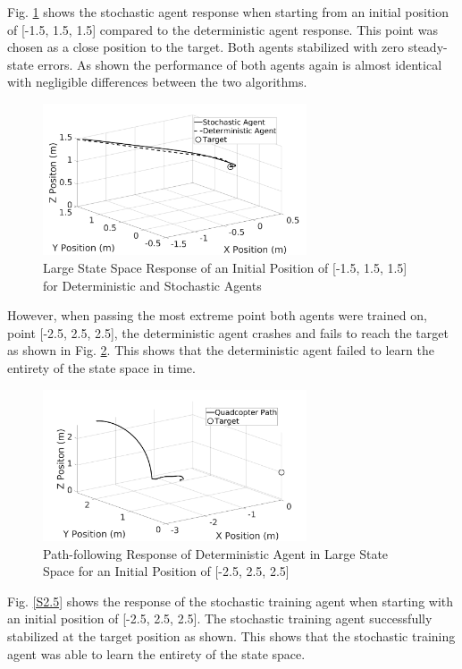 Fig. \ref{x2.5} shows the stochastic agent response when starting from an initial position of [-1.5, 1.5, 1.5] compared to the deterministic agent response. This point was chosen as a close position to the target. Both agents stabilized with zero steady-state errors. As shown the performance of both agents again is almost identical with negligible differences between the two algorithms.
\begin{figure}[H]
            \centering
            \includegraphics[width=0.695\textwidth]{plots/1_5_1.jpg}
            \caption{Large State Space Response of an Initial Position of [-1.5, 1.5, 1.5] for Deterministic and Stochastic Agents}
            \label{x2.5}
    \end{figure}
    However, when passing the most extreme point both agents were trained on, point [-2.5, 2.5, 2.5], the deterministic agent crashes and fails to reach the target as shown in Fig. \ref{T2.5}. This shows that the deterministic agent failed to learn the entirety of the state space in time. 
    \begin{figure}[H]
            \centering
            \includegraphics[width=0.695\textwidth]{plots/2_5_crash.jpg}
            \caption{Path-following Response of Deterministic Agent in Large State Space for an Initial Position of [-2.5, 2.5, 2.5]}
            \label{T2.5}
    \end{figure}
    Fig. \ref{S2.5} shows the response of the stochastic training agent when starting with an initial position of [-2.5, 2.5, 2.5]. The stochastic training agent successfully stabilized at the target position as shown. This shows that the stochastic training agent was able to learn the entirety of the state space. 
